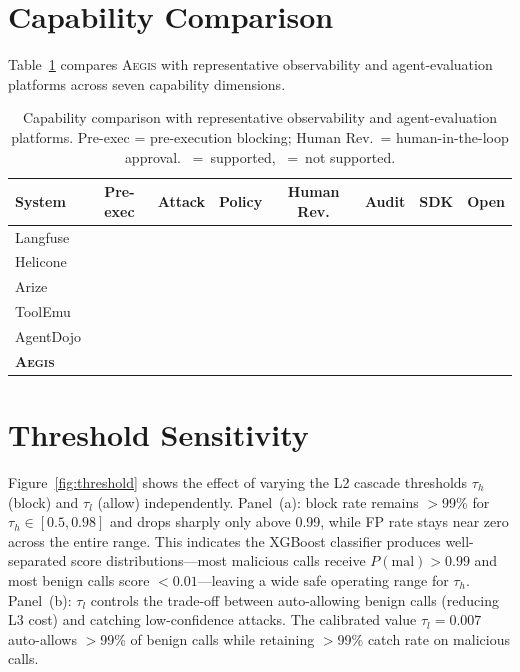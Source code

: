 \documentclass{article}
\newcommand{\system}{\textsc{Aegis}\xspace}
\newcommand{\cmark}{{\color{green!60!black}\ding{51}}}
\newcommand{\xmark}{{\color{red!70!black}\ding{55}}}
\begin{document}
\section{Capability Comparison}
\label{app:comparison}

Table~\ref{tab:comparison} compares \system with representative observability and agent-evaluation platforms across seven capability dimensions.

\begin{table}[h]
\centering
\small
\caption{Capability comparison with representative observability and agent-evaluation platforms. Pre-exec = pre-execution blocking; Human Rev.\ = human-in-the-loop approval. \cmark~=~supported, \xmark~=~not supported.}
\label{tab:comparison}
\setlength{\tabcolsep}{4pt}
\begin{tabular}{l c c c c c c c}
\toprule
System & Pre-exec & Attack & Policy & Human Rev. & Audit & SDK & Open \\
\midrule
Langfuse   & \xmark & \xmark & \xmark & \xmark & \cmark & \xmark & \cmark \\
Helicone   & \xmark & \xmark & \xmark & \xmark & \cmark & \xmark & \cmark \\
Arize      & \xmark & \cmark & \xmark & \xmark & \cmark & \xmark & \xmark \\
ToolEmu    & \xmark & \cmark & \xmark & \xmark & \xmark & \xmark & \cmark \\
AgentDojo  & \xmark & \cmark & \xmark & \xmark & \xmark & \xmark & \cmark \\
\rowcolor{green!6}
\textbf{\system} & \cmark & \cmark & \cmark & \cmark & \cmark & \cmark & \cmark \\
\bottomrule
\end{tabular}
\end{table}

\section{Threshold Sensitivity}
\label{app:threshold}

Figure~\ref{fig:threshold} shows the effect of varying the L2 cascade thresholds $\tau_h$ (block) and $\tau_l$ (allow) independently.
Panel~(a): block rate remains $>$99\% for $\tau_h \in [0.5, 0.98]$ and drops sharply only above 0.99, while FP rate stays near zero across the entire range.
This indicates the XGBoost classifier produces well-separated score distributions---most malicious calls receive $P(\text{mal}) > 0.99$ and most benign calls score $< 0.01$---leaving a wide safe operating range for $\tau_h$.
Panel~(b): $\tau_l$ controls the trade-off between auto-allowing benign calls (reducing L3 cost) and catching low-confidence attacks.
The calibrated value $\tau_l = 0.007$ auto-allows $>$99\% of benign calls while retaining $>$99\% catch rate on malicious calls.
\end{document}
